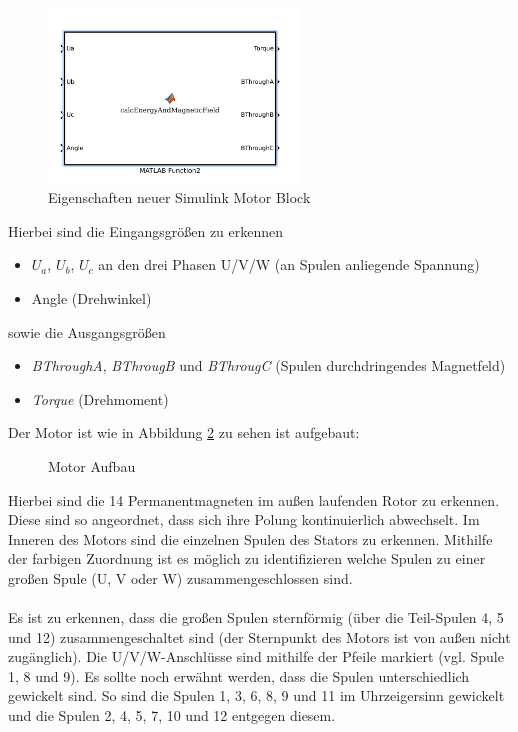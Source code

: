 \begin{figure}[htbp]
	\centering
	\includegraphics[width=0.6\textwidth]{./sim/pictures/matlabBox.png}
	\caption{Eigenschaften neuer Simulink Motor Block}
	\label{FigMotorBlock}
\end{figure}
Hierbei sind die Eingangsgrößen zu erkennen
\begin{itemize}
	\item $U_a$, $U_b$, $U_c$ an den drei Phasen U/V/W (an Spulen anliegende Spannung)
	\item Angle (Drehwinkel)
\end{itemize}
sowie die Ausgangsgrößen
\begin{itemize}
	\item \textit{BThroughA}, \textit{BThrougB} und \textit{BThrougC} (Spulen durchdringendes Magnetfeld)
	\item \textit{Torque} (Drehmoment)
\end{itemize}

\vspace{1cm}
Der Motor ist wie in Abbildung \ref{FigMotorAufbau} zu sehen ist aufgebaut:

\begin{figure}[htbp] 
	\centering
	
	\caption{Motor Aufbau}
	\label{FigMotorAufbau}
\end{figure}


Hierbei sind die 14 Permanentmagneten im außen laufenden Rotor zu erkennen. Diese sind so angeordnet, dass sich ihre Polung kontinuierlich abwechselt. 
Im Inneren des Motors sind die einzelnen Spulen des Stators zu erkennen. Mithilfe der farbigen Zuordnung ist es möglich zu identifizieren welche Spulen zu einer großen Spule (U, V oder W) zusammengeschlossen sind. 

\paragraph{}
Es ist zu erkennen, dass die großen Spulen sternförmig (über die Teil-Spulen 4, 5 und 12) zusammengeschaltet sind (der Sternpunkt des Motors ist von außen nicht zugänglich).
Die U/V/W-Anschlüsse sind mithilfe der Pfeile markiert (vgl. Spule 1, 8 und 9). 
Es sollte noch erwähnt werden, dass die Spulen unterschiedlich gewickelt sind. So sind die Spulen 1, 3, 6, 8, 9 und 11 im Uhrzeigersinn gewickelt und die Spulen 2, 4, 5, 7, 10 und 12 entgegen diesem.

